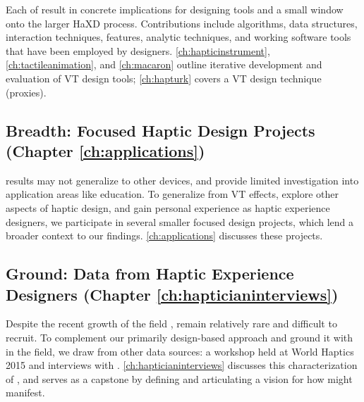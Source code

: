 Each of  result in concrete implications for designing tools and a small window onto the larger HaXD process.
Contributions include algorithms, data structures, interaction techniques, features, analytic techniques, and working software tools that have been employed by designers.
\autoref{ch:hapticinstrument}, \autoref{ch:tactileanimation}, and \autoref{ch:macaron} outline iterative development and evaluation of VT design tools; \autoref{ch:hapturk} covers a VT design technique (proxies).

\subsection{Breadth: Focused Haptic Design Projects (Chapter \ref{ch:applications})}
 results may not generalize to other devices, and provide limited investigation into application areas like education.
To generalize from VT effects, explore other aspects of haptic design, and gain personal experience as haptic experience designers, we participate in several smaller focused design projects, which lend a broader context to our findings.
\autoref{ch:applications} discusses these projects.

\subsection{Ground: Data from Haptic Experience Designers (Chapter \ref{ch:hapticianinterviews})}
Despite the recent growth of the field ,  remain relatively rare and difficult to recruit.
To complement our primarily design-based approach and ground it with  in the field, we draw from other data sources: a workshop held at World Haptics 2015 and interviews with .
\autoref{ch:hapticianinterviews} discusses this characterization of \haxd, and serves as a capstone  by defining \haxd and articulating a vision for how \haxd might manifest.




\section{}

